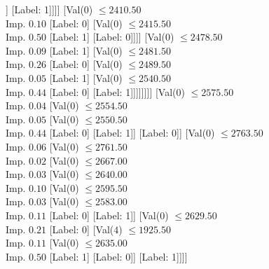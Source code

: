 \documentclass[margin=10pt]{standalone}
\begin{document}
\begin{forest}
												[Val($0$) $ \leq 2288.50$ \\ Imp. $0.18$
													[Label: 0]
													[Val($0$) $ \leq 2323.50$ \\ Imp. $0.05$
														[Label: 1]
														[Val($0$) $ \leq 2336.00$ \\ Imp. $0.22$
															[Val($0$) $ \leq 2326.50$ \\ Imp. $0.11$
																[Label: 0]
																[Label: 1]]
															[Label: 1]]]]
												[Val($0$) $ \leq 2410.50$ \\ Imp. $0.10$
													[Label: 0]
													[Val($0$) $ \leq 2415.50$ \\ Imp. $0.50$
														[Label: 1]
														[Label: 0]]]]
											[Val($0$) $ \leq 2478.50$ \\ Imp. $0.09$
												[Label: 1]
												[Val($0$) $ \leq 2481.50$ \\ Imp. $0.26$
													[Label: 0]
													[Val($0$) $ \leq 2489.50$ \\ Imp. $0.05$
														[Label: 1]
														[Val($0$) $ \leq 2540.50$ \\ Imp. $0.44$
															[Label: 0]
															[Label: 1]]]]]]]]
								[Val($0$) $ \leq 2575.50$ \\ Imp. $0.04$
									[Val($0$) $ \leq 2554.50$ \\ Imp. $0.05$
										[Val($0$) $ \leq 2550.50$ \\ Imp. $0.44$
											[Label: 0]
											[Label: 1]]
										[Label: 0]]
									[Val($0$) $ \leq 2763.50$ \\ Imp. $0.06$
										[Val($0$) $ \leq 2761.50$ \\ Imp. $0.02$
											[Val($0$) $ \leq 2667.00$ \\ Imp. $0.03$
												[Val($0$) $ \leq 2640.00$ \\ Imp. $0.10$
													[Val($0$) $ \leq 2595.50$ \\ Imp. $0.03$
														[Val($0$) $ \leq 2583.00$ \\ Imp. $0.11$
															[Label: 0]
															[Label: 1]]
														[Val($0$) $ \leq 2629.50$ \\ Imp. $0.21$
															[Label: 0]
															[Val($4$) $ \leq 1925.50$ \\ Imp. $0.11$
																[Val($0$) $ \leq 2635.00$ \\ Imp. $0.50$
																	[Label: 1]
																	[Label: 0]]
																[Label: 1]]]]

\end{forest}
\end{document}
